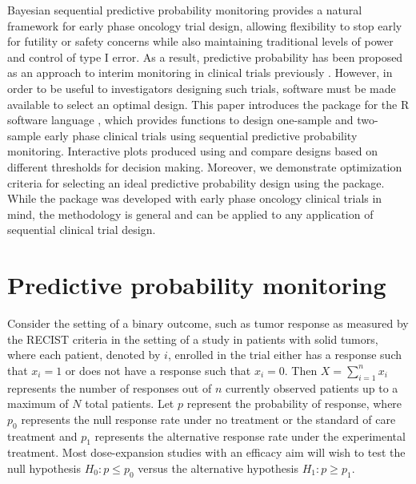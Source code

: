 Bayesian sequential predictive probability monitoring provides a natural
framework for early phase oncology trial design, allowing flexibility to
stop early for futility or safety concerns while also maintaining
traditional levels of power and control of type I error. As a result,
predictive probability has been proposed as an approach to interim
monitoring in clinical trials previously
\citep{Dmitrienko2006, Lee2008, Saville2014, Hobbs2018}. However, in
order to be useful to investigators designing such trials, software must
be made available to select an optimal design. This paper introduces the
 package for the R software language \citep{RCT2020}, which
provides functions to design one-sample and two-sample early phase
clinical trials using sequential predictive probability monitoring.
Interactive plots produced using  and 
compare designs based on different thresholds for decision making.
Moreover, we demonstrate optimization criteria for selecting an ideal
predictive probability design using the  package. While the
 package was developed with early phase oncology clinical
trials in mind, the methodology is general and can be applied to any
application of sequential clinical trial design.

\hypertarget{predictive-probability-monitoring}{%
\section{Predictive probability
monitoring}\label{predictive-probability-monitoring}}

Consider the setting of a binary outcome, such as tumor response as
measured by the RECIST criteria in the setting of a study in patients
with solid tumors, where each patient, denoted by \(i\), enrolled in the
trial either has a response such that \(x_i = 1\) or does not have a
response such that \(x_i = 0\). Then \(X = \sum_{i=1}^n x_i\) represents
the number of responses out of \(n\) currently observed patients up to a
maximum of \(N\) total patients. Let \(p\) represent the probability of
response, where \(p_0\) represents the null response rate under no
treatment or the standard of care treatment and \(p_1\) represents the
alternative response rate under the experimental treatment. Most
dose-expansion studies with an efficacy aim will wish to test the null
hypothesis \(H_0: p \leq p_0\) versus the alternative hypothesis
\(H_1: p \geq p_1\).

